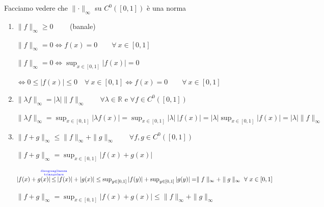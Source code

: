 \begin{exbar}
\begin{example}
	Facciamo vedere che $\parallel \cdot \parallel_\infty$ su $C^0 ([0,1])$ è una norma
	\begin{enumerate}
		\item $\parallel f \parallel_\infty \geq 0 \qquad$ (banale)
		
		$\parallel f \parallel_\infty =  0 \iff f(x) = 0 \qquad \forall \ x \in [0, 1]$
		
		$\parallel f \parallel_\infty =  0 \iff \sup_{x \in [0,1]} |f(x)| = 0$
		
		$\iff 0 \leq |f(x)| \leq 0 \quad \forall \ x \in [0,1] \iff f(x) = 0 \qquad \forall \ x \in [0,1]$
		
		\item $\parallel \lambda f \parallel_\infty = |\lambda| \parallel f \parallel_\infty \qquad \forall \lambda \in \mathbb{R}$ e $\forall f \in C^0 ([0,1])$
		
		$\parallel \lambda f \parallel_\infty = \sup_{x \in[0,1]} |\lambda f(x)| = \sup_{x\in[0,1]} |\lambda| \ |f(x)| = |\lambda| \sup_{x\in[0,1]} |f(x)| = |\lambda| \parallel f \parallel_\infty$
		
		\item $\parallel f+g \parallel_\infty \leq \parallel f \parallel_\infty + \parallel g \parallel_\infty \qquad \forall f,g \in C^0 ([0,1])$
		
		$\parallel f+g \parallel_\infty = \sup_{x\in[0,1]} |f(x) + g(x)|$
		
		$|f(x) + g(x)| \distr |f(x)| + |g(x)| \leq \sup_{y\in[0,1]} |f(y)| + \sup_{y\in[0,1]} |g(y)| =  \parallel f \parallel_\infty + \parallel g \parallel_\infty \ \forall \ x \in [0,1]$
		
		$\parallel f+g \parallel_\infty = \sup_{x\in[0,1]} |f(x) + g(x)| \leq \parallel f \parallel_\infty + \parallel g \parallel_\infty$
	\end{enumerate}
\end{example}
\end{exbar}
	

